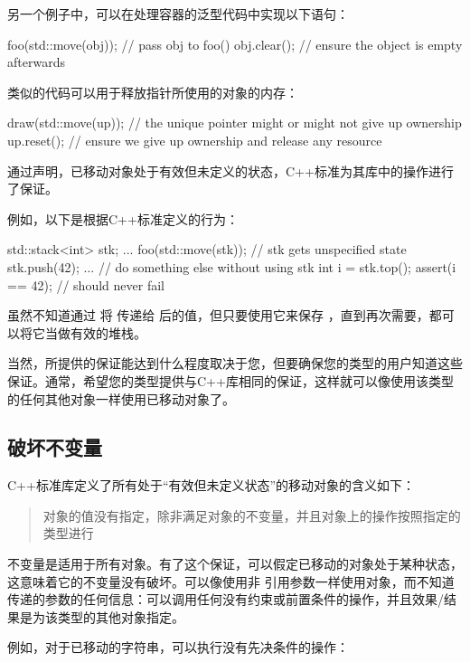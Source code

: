 另一个例子中，可以在处理容器的泛型代码中实现以下语句：

\begin{cppcode}
foo(std::move(obj)); // pass obj to foo()
obj.clear(); // ensure the object is empty afterwards
\end{cppcode}

类似的代码可以用于释放指针所使用的对象的内存：

\begin{cppcode}
draw(std::move(up)); // the unique pointer might or might not give up ownership
up.reset(); // ensure we give up ownership and release any resource
\end{cppcode}

通过声明，已移动对象处于有效但未定义的状态，C++标准为其库中的操作进行了保证。

例如，以下是根据C++标准定义的行为：

\begin{cppcode}
std::stack<int> stk;
...
foo(std::move(stk)); // stk gets unspecified state
stk.push(42);
... // do something else without using stk
int i = stk.top();
assert(i == 42); // should never fail
\end{cppcode}

虽然不知道通过  将  传递给  后的值，但只要使用它来保存 ，直到再次需要，都可以将它当做有效的堆栈。

当然，所提供的保证能达到什么程度取决于您，但要确保您的类型的用户知道这些保证。通常，希望您的类型提供与C++库相同的保证，这样就可以像使用该类型的任何其他对象一样使用已移动对象了。

\subsection{破坏不变量}

C++标准库定义了所有处于“有效但未定义状态”的移动对象的含义如下：

\begin{quote}
	对象的值没有指定，除非满足对象的不变量，并且对象上的操作按照指定的类型进行
\end{quote}

不变量是适用于所有对象。有了这个保证，可以假定已移动的对象处于某种状态，这意味着它的不变量没有破坏。可以像使用非  引用参数一样使用对象，而不知道传递的参数的任何信息：可以调用任何没有约束或前置条件的操作，并且效果/结果是为该类型的其他对象指定。

例如，对于已移动的字符串，可以执行没有先决条件的操作：

